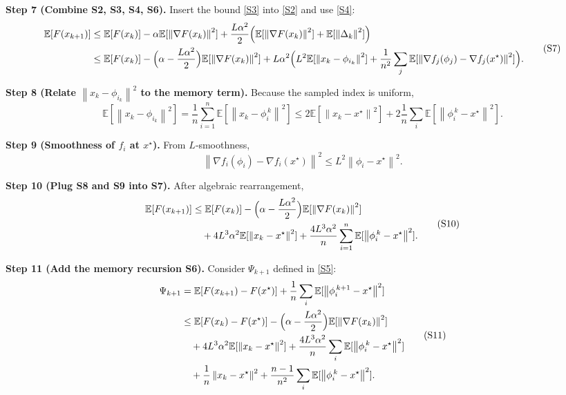 \documentclass[11pt]{article}
\newcommand{\E}{\mathbb{E}}
\newcommand{\norm}[1]{\left\|#1\right\|}
\newcommand{\grad}{\nabla}
\begin{document}
\noindent\textbf{Step 7 (Combine S2, S3, S4, S6).}  
Insert the bound \eqref{S3} into \eqref{S2} and use \eqref{S4}:
\[
\begin{aligned}
\E[F(x_{k+1})]
&\le \E[F(x_k)]-\alpha\E[\norm{\grad F(x_k)}^{2}]
   +\frac{L\alpha^{2}}{2}\Bigl(\E[\norm{\grad F(x_k)}^{2}]
   +\E[\norm{\Delta_k}^{2}]\Bigr)\\
&\le \E[F(x_k)]-\Bigl(\alpha-\frac{L\alpha^{2}}{2}\Bigr)\E[\norm{\grad F(x_k)}^{2}]
   +L\alpha^{2}\Bigl(L^{2}\E[\norm{x_k-\phi_{i_k}}^{2}]
   +\frac{1}{n^{2}}\sum_{j}\E[\norm{\grad f_j(\phi_j)-\grad f_j(x^\star)}^{2}]\Bigr).
\end{aligned}
\tag{S7}
\]

\noindent\textbf{Step 8 (Relate $\norm{x_k-\phi_{i_k}}^{2}$ to the memory term).}  
Because the sampled index is uniform,
\[
\E[\norm{x_k-\phi_{i_k}}^{2}]
= \frac{1}{n}\sum_{i=1}^{n}\E[\norm{x_k-\phi_i^{\,k}}^{2}]
\le 2\E[\norm{x_k-x^\star}^{2}]
   +2\frac{1}{n}\sum_{i}\E[\norm{\phi_i^{\,k}-x^\star}^{2}].
\tag{S8}
\]

\noindent\textbf{Step 9 (Smoothness of $f_i$ at $x^\star$).}  
From $L$‑smoothness,
\[
\norm{\grad f_i(\phi_i)-\grad f_i(x^\star)}^{2}
\le L^{2}\norm{\phi_i-x^\star}^{2}.
\tag{S9}
\]

\noindent\textbf{Step 10 (Plug S8 and S9 into S7).}  
After algebraic rearrangement,
\[
\begin{aligned}
\E[F(x_{k+1})]
&\le \E[F(x_k)]-\Bigl(\alpha-\frac{L\alpha^{2}}{2}\Bigr)\E[\norm{\grad F(x_k)}^{2}] \\
&\quad + 4L^{3}\alpha^{2}\E[\norm{x_k-x^\star}^{2}]
   +\frac{4L^{3}\alpha^{2}}{n}\sum_{i=1}^{n}\E[\norm{\phi_i^{\,k}-x^\star}^{2}].
\end{aligned}
\tag{S10}
\]

\noindent\textbf{Step 11 (Add the memory recursion S6).}  
Consider $\Psi_{k+1}$ defined in \eqref{S5}:
\[
\begin{aligned}
\Psi_{k+1}
&= \E[F(x_{k+1})-F(x^\star)]
   +\frac{1}{n}\sum_{i}\E[\norm{\phi_i^{\,k+1}-x^\star}^{2}]\\
&\le \E[F(x_k)-F(x^\star)]
   -\Bigl(\alpha-\frac{L\alpha^{2}}{2}\Bigr)\E[\norm{\grad F(x_k)}^{2}] \\
&\quad +4L^{3}\alpha^{2}\E[\norm{x_k-x^\star}^{2}]
   +\frac{4L^{3}\alpha^{2}}{n}\sum_{i}\E[\norm{\phi_i^{\,k}-x^\star}^{2}] \\
&\quad +\frac{1}{n}\norm{x_k-x^\star}^{2}
   +\frac{n-1}{n^{2}}\sum_{i}\E[\norm{\phi_i^{\,k}-x^\star}^{2}].
\end{aligned}
\tag{S11}
\]
\end{document}
